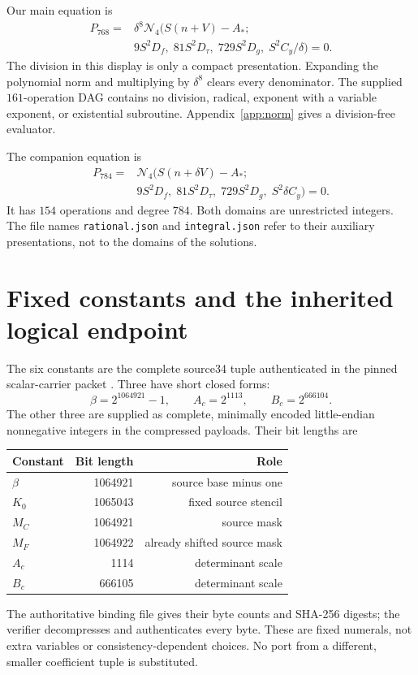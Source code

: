 \documentclass[11pt]{article}
\newcommand{\NN}{\mathcal N_4}\newcommand{\PP}{\mathcal P}
\newcommand{\file}[1]{\nolinkurl{#1}}
\theoremstyle{definition}\newtheorem{definition}[theorem]{Definition}
\theoremstyle{remark}\newtheorem{remark}[theorem]{Remark}
\begin{document}
Our main equation is
\begin{equation}\label{eq:768}
\boxed{\begin{aligned}
 P_{768}={}&\delta^8\NN\bigl(S(n+V)-A_*;\\
 &9S^2D_f,\;81S^2D_\tau,\;729S^2D_g,\;S^2C_y/\delta\bigr)=0.
\end{aligned}}
\end{equation}
The division in this display is only a compact presentation. Expanding
the polynomial norm and multiplying by $\delta^8$ clears every denominator.
The supplied $161$-operation DAG contains no division, radical, exponent
with a variable exponent, or existential subroutine. Appendix~\ref{app:norm}
gives a division-free evaluator.

The companion equation is
\begin{equation}\label{eq:784}
\boxed{\begin{aligned}
 P_{784}={}&\NN\bigl(S(n+\delta V)-A_*;\\
 &9S^2D_f,\;81S^2D_\tau,\;729S^2D_g,\;S^2\delta C_y\bigr)=0.
\end{aligned}}
\end{equation}
It has $154$ operations and degree $784$. Both domains are unrestricted
integers. The file names \file{rational.json} and \file{integral.json}
refer to their auxiliary presentations, not to the domains of the solutions.

\section{Fixed constants and the inherited logical endpoint}
\label{sec:constants}

The six constants are the complete source34 tuple authenticated in the
pinned scalar-carrier packet \cite{scalar}. Three have short closed forms:
\[
 \beta=2^{1064921}-1,\qquad A_c=2^{1113},\qquad B_c=2^{666104}.
\]
The other three are supplied as complete, minimally encoded little-endian
nonnegative integers in the compressed payloads. Their bit lengths are
\begin{center}
\begin{tabular}{lrr}
\toprule
Constant & Bit length & Role\\\midrule
$\beta$&1064921&source base minus one\\
$K_0$&1065043&fixed source stencil\\
$M_C$&1064921&source mask\\
$M_F$&1064922&already shifted source mask\\
$A_c$&1114&determinant scale\\
$B_c$&666105&determinant scale\\\bottomrule
\end{tabular}
\end{center}
The authoritative binding file gives their byte counts and SHA-256 digests;
the verifier decompresses and authenticates every byte. These are fixed
numerals, not extra variables or consistency-dependent choices. No port
from a different, smaller coefficient tuple is substituted.
\end{document}

